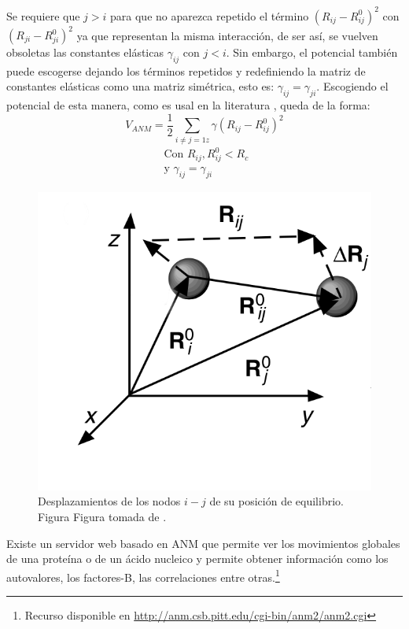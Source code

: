 Se requiere que $j>i$ para que no aparezca repetido el t\'{e}rmino $\left(R_{ij}-R_{ij}^0\right)^2$ con $\left(R_{ji}-R_{ji}^0\right)^2$   ya que representan la misma interacci\'{o}n, de ser as\'{i}, se vuelven obsoletas las constantes el\'{a}sticas $\gamma_{ij}$ con $j<i$. Sin embargo, el potencial tambi\'{e}n puede escogerse dejando los t\'{e}rminos repetidos y redefiniendo la matriz de constantes el\'{a}sticas como una matriz sim\'{e}trica, esto es: $\gamma_{ij}=\gamma_{ji}$. Escogiendo el potencial de esta manera, como es usal en la literatura \cite{Rader2006}, queda de la forma:
\begin{equation}\label{eq:26}
V_{ANM}=
   \frac{1}{2}\sum_{
   i\neq j=1  z
   }
   \gamma\left(R_{ij}-R_{ij}^0\right)^2
\end{equation}
\begin{eqnarray*}
\mbox{			Con		} R_{ij},R_{ij}^0<R_c \\
\mbox{			y		} \gamma_{ij}=\gamma_{ji}
\end{eqnarray*}
\begin{figure}
\centering%
\includegraphics[scale=0.3]{Kap2/resorte.png}%
\caption{Desplazamientos de los nodos $i-j$ de su posici\'{o}n de equilibrio. Figura Figura tomada de \cite{Rader2006}.} \label{fig:res}
\end{figure}
Existe un servidor web \cite{Eyal2015} basado en ANM que permite ver los movimientos globales de una prote\'{i}na o de un \'{a}cido nucleico y permite obtener informaci\'{o}n como los autovalores, los factores-B, las correlaciones entre otras.\footnote{ Recurso disponible en \url{http://anm.csb.pitt.edu/cgi-bin/anm2/anm2.cgi}}
